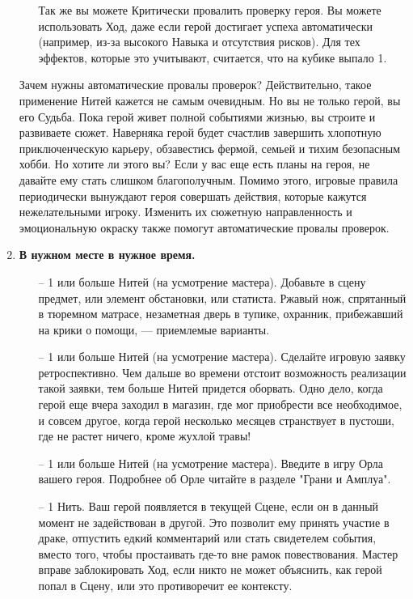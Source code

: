 \begin{enumerate}
\begin{itemize}
\newline Так же вы можете Критически провалить проверку героя. Вы можете использовать Ход, даже если герой достигает успеха автоматически (например, из-за высокого Навыка и отсутствия рисков). Для тех эффектов, которые это учитывают, считается, что на кубике выпало 1.
\end{itemize}
\begin{tcolorbox}
Зачем нужны автоматические провалы проверок? Действительно, такое применение Нитей кажется не самым очевидным. Но вы не только герой, вы его Судьба. Пока герой живет полной событиями жизнью, вы строите и развиваете сюжет. Наверняка герой будет счастлив завершить хлопотную приключенческую карьеру, обзавестись фермой, семьей и тихим безопасным хобби. Но хотите ли этого вы? Если у вас еще есть планы на героя, не давайте ему стать слишком благополучным.
\newline Помимо этого, игровые правила периодически вынуждают героя совершать действия, которые кажутся нежелательными игроку. Изменить их сюжетную направленность и эмоциональную окраску также помогут автоматические провалы проверок.
\end{tcolorbox}
\item \textbf{В нужном месте в нужное время.}
\begin{itemize}
\item[--] 1 или больше Нитей (на усмотрение мастера). Добавьте в сцену предмет, или элемент обстановки, или статиста. Ржавый нож, спрятанный в тюремном матрасе, незаметная дверь в тупике, охранник, прибежавший на крики о помощи, — приемлемые варианты.
\item[--] 1 или больше Нитей (на усмотрение мастера). Сделайте игровую заявку ретроспективно. Чем дальше во времени отстоит возможность реализации такой заявки, тем больше Нитей придется оборвать. Одно дело, когда герой еще вчера заходил в магазин, где мог приобрести все необходимое, и совсем другое, когда герой несколько месяцев странствует в пустоши, где не растет ничего, кроме жухлой травы!
\item[--] 1 или больше Нитей (на усмотрение мастера). Введите в игру Орла вашего героя. Подробнее об Орле читайте в разделе "Грани и Амплуа".
\item[--] 1 Нить. Ваш герой появляется в текущей Сцене, если он в данный момент не задействован в другой. Это позволит ему принять участие в драке, отпустить едкий комментарий или стать свидетелем события, вместо того, чтобы простаивать где-то вне рамок повествования. Мастер вправе заблокировать Ход, если никто не может объяснить, как герой попал в Сцену, или это противоречит ее контексту.

\end{itemize}
\end{enumerate}
